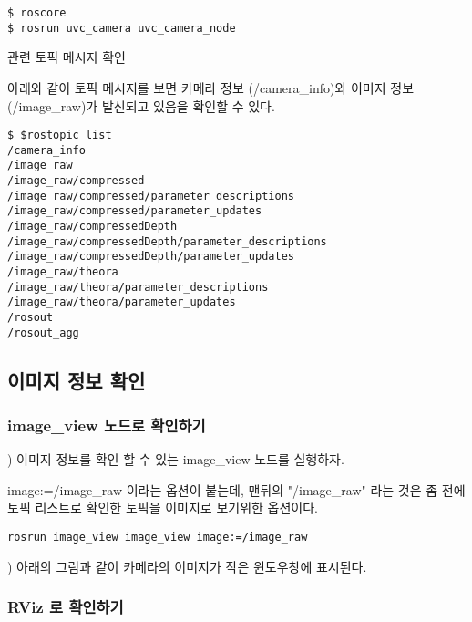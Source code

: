 \begin{lstlisting}[language=ROS]
$ roscore
$ rosrun uvc_camera uvc_camera_node
\end{lstlisting}

\circled{\thenum} 관련 토픽 메시지 확인

아래와 같이 토픽 메시지를 보면 카메라 정보 (/camera\_info)와 이미지 정보 (/image\_raw)가 발신되고 있음을 확인할 수 있다.

\begin{lstlisting}[language=ROS]
$ $rostopic list
/camera_info
/image_raw
/image_raw/compressed
/image_raw/compressed/parameter_descriptions
/image_raw/compressed/parameter_updates
/image_raw/compressedDepth
/image_raw/compressedDepth/parameter_descriptions
/image_raw/compressedDepth/parameter_updates
/image_raw/theora
/image_raw/theora/parameter_descriptions
/image_raw/theora/parameter_updates
/rosout
/rosout_agg
\end{lstlisting}

\subsection{이미지 정보 확인}

\subsubsection{image\_view 노드로 확인하기}

\setcounter{num}{0}

\noindent
{}\thenum) 이미지 정보를 확인 할 수 있는 image\_view 노드를 실행하자.

\noindent
image:=/image\_raw 이라는 옵션이 붙는데, 맨뒤의 "/image\_raw" 라는 것은 좀 전에 토픽 리스트로 확인한 토픽을 이미지로 보기위한 옵션이다.

\begin{lstlisting}[language=ROS]
rosrun image_view image_view image:=/image_raw
\end{lstlisting}

\noindent
{}\thenum) 아래의 그림과 같이 카메라의 이미지가 작은 윈도우창에 표시된다.

\subsubsection{RViz 로 확인하기}

